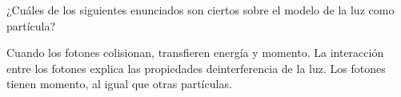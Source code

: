 ¿Cuáles de los siguientes enunciados son ciertos sobre el modelo
de la luz como partícula?

\begin{checkboxes}
    \CorrectChoice Cuando los fotones colisionan, transfieren energía y momento.
    \choice La interacción entre los fotones explica las propiedades deinterferencia de la luz.
    \CorrectChoice Los fotones tienen momento, al igual que otras partículas.
\end{checkboxes}